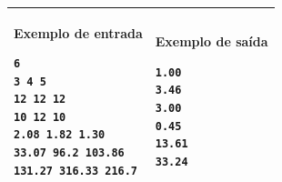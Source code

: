 \begin{table}[!h]
\centering
\begin{tabular}{|l|l|}
\hline
\begin{minipage}[t]{3in}
\textbf{Exemplo de entrada}
\begin{verbatim}
6
3 4 5
12 12 12
10 12 10
2.08 1.82 1.30
33.07 96.2 103.86
131.27 316.33 216.7
\end{verbatim}
\vspace{1mm}
\end{minipage}
&
\begin{minipage}[t]{3in}
\textbf{Exemplo de saída}
\begin{verbatim}
1.00
3.46
3.00
0.45
13.61
33.24
\end{verbatim}
\vspace{1mm}
\end{minipage} \\
\hline
\end{tabular}
\end{table}
